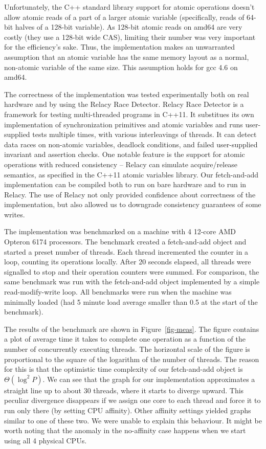 \documentclass[a4paper,11pt]{article}
\begin{document}
Unfortunately, the C++ standard library support for atomic operations doesn't allow atomic reads of a part of a larger atomic variable (specifically, reads of 64-bit halves of a 128-bit variable).
As 128-bit atomic reads on amd64 are very costly
(they use a 128-bit wide CAS), limiting their number was very important for the efficiency's sake. Thus, the implementation makes an unwarranted assumption that an atomic variable
has the same memory layout as a normal, non-atomic variable of the same size. This assumption holds for gcc 4.6 on amd64.

The correctness of the implementation was tested experimentally both on real hardware and by using the Relacy Race Detector\cite{rrd}. Relacy Race Detector is a framework for testing multi-threaded programs in C++11.
It substitues its own
implementation of synchronization primitives and atomic variables and runs user-supplied tests multiple times, with various interleavings of threads.
It can detect data races on non-atomic variables, deadlock conditions, and failed user-supplied invariant and assertion
checks. One notable feature is the support for atomic operations with reduced consistency -- Relacy can simulate acquire/release semantics, as specified in the C++11 atomic variables library.
Our fetch-and-add implementation can be compiled both to run on bare hardware and to run in Relacy. The use of Relacy not only provided confidence about correctness of the implementation, but also allowed us to downgrade
consistency guarantees of some writes.


The implementation was benchmarked on a machine with 4 12-core AMD Opteron 6174 processors.
The benchmark created a fetch-and-add object and started a preset number of threads. Each thread incremented the counter in a loop, counting its operations locally. After 20 seconds elapsed, all threads were signalled
to stop and their operation counters were summed. For comparison, the same benchmark was run with the fetch-and-add object implemented by a simple read-modify-write loop. All benchmarks were run when the machine was
minimally loaded (had 5 minute load average smaller than 0.5 at the start of the benchmark).

The results of the benchmark are shown in Figure~\ref{fig-meas}. The figure contains a plot of average time it takes to complete one operation as a function of the number of concurrently executing threads. 
The horizontal scale of the figure is proportional to the square of the logarithm of the number of threads. The reason for this is that the optimistic time complexity
of our fetch-and-add object is $\Theta(\log^2 P)$. We can see that the graph for our implementation approximates a straight line up to about 30 threads, where it starts to diverge upward. This peculiar divergence disappears
if we assign one core to each thread and force it to run only there (by setting CPU affinity). Other affinity settings yielded graphs similar to one of these two. We were unable to explain this behaviour. It might
be worth noting that the anomaly in the no-affinity case happens when we start using all 4 physical CPUs.
\end{document}

